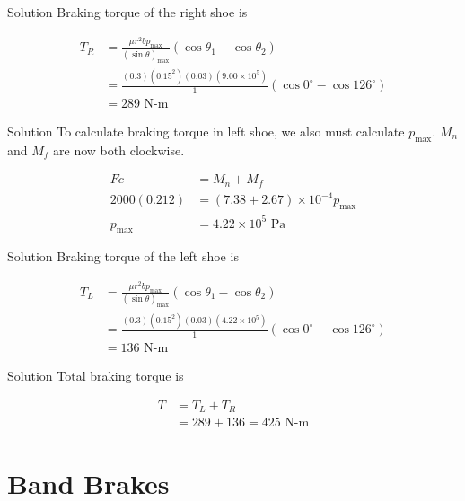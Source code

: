 \documentclass[10pt, svgnames]{beamer}
\begin{document}
\begin{frame}[label={sec:org7f1bd56}]{Solution}
Braking torque of the right shoe is

\begin{align*}
    T_R &= \frac{\mu r^2 bp_{\max}}{(\sin \theta)_{\max}} (\cos \theta_1 - \cos \theta_2) \\
        &= \frac{(0.3)(0.15^2)(0.03)(9.00 \times 10^5)}{1} (\cos 0^{\circ} - \cos 126^{\circ}) \\
        &= 289 \text{ N-m}
\end{align*}
\end{frame}

\begin{frame}[label={sec:orgaf6a0c6}]{Solution}
To calculate braking torque in left shoe, we also must calculate \(p_{\max}\). \(M_n\) and \(M_f\) are now both clockwise.

\begin{align*}
    Fc &= M_n + M_f \\
    2000(0.212) &= (7.38 + 2.67) \times 10^{-4} p_{\max} \\
    p_{\max} &= 4.22 \times 10^5 \text{ Pa}
\end{align*}
\end{frame}

\begin{frame}[label={sec:org91dab69}]{Solution}
Braking torque of the left shoe is

\begin{align*}
    T_L &= \frac{\mu r^2 bp_{\max}}{(\sin \theta)_{\max}} (\cos \theta_1 - \cos \theta_2) \\
        &= \frac{(0.3)(0.15^2)(0.03)(4.22 \times 10^5)}{1} (\cos 0^{\circ} - \cos 126^{\circ}) \\
        &= 136 \text{ N-m}
\end{align*}
\end{frame}

\begin{frame}[label={sec:org4a82141}]{Solution}
Total braking torque is

\begin{align*}
    T &= T_L + T_R \\
        &= 289 + 136 = 425 \text{ N-m}
\end{align*}
\end{frame}

\section{Band Brakes}
\label{sec:org4867a38}
\end{document}
